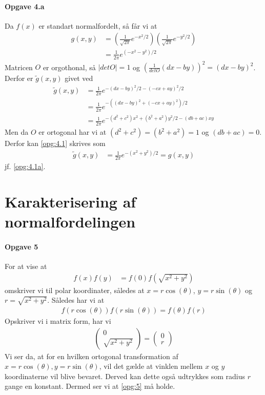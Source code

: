 \documentclass{article} %
\begin{document}
\paragraph*{Opgave 4.a}
Da \(f(x)\) er standart normalfordelt, så får vi at
\begin{align}
    g(x,y) & = \left(\frac{1}{\sqrt{2\pi}} e^{-x^2/2}\right)\left(\frac{1}{\sqrt{2\pi}} e^{-y^2/2}\right) \\
           & = \frac{1}{2\pi}e^{(-x^2-y^2)/2} \label{opg:4.1a}
\end{align}
Matricen \(O\) er orgothonal, så \(|detO|=1\) og \(\left(\frac{1}{detO}(dx-by)\right)^2=\left(dx-by\right)^2\). Derfor er \(\tilde{g}(x,y)\) givet ved
\begin{align}
   \tilde{g}(x,y) & =  \frac{1}{2\pi}e^{-(dx-by)^2/2-(-cx+ay)^2/2} \\
                  & =  \frac{1}{2\pi}e^{-\left((dx-by)^2+(-cx+ay)^2\right)/2} \\
                  & =  \frac{1}{2\pi}e^{-(d^2+c^2)x^2+(b^2+a^2)y^2/2-(db+ac)xy} \label{opg:4.1}
\end{align}
Men da \(O\) er ortogonal har vi at \((d^2+c^2)=(b^2+a^2)=1\) og \((db+ac)=0\). Derfor kan \cref{opg:4.1} skrives som
\begin{align}
   \tilde{g}(x,y) & =  \frac{1}{2\pi}e^{-(x^2+y^2)/2} = g(x,y)
\end{align}
jf. \cref{opg:4.1a}.
\section{Karakterisering af normalfordelingen} %
\label{sec:karaktisering_af_normalfordelingen}
\paragraph*{Opgave 5}
For at vise at
\begin{align}
    f(x)f(y) & = f(0)f(\sqrt{x^2+y^2}) \label{opg:5}
\end{align}
omskriver vi til polar koordinater, således at \(x=r\cos(\theta)\), \(y=r\sin(\theta)\) og \(r=\sqrt{x^2+y^2}\)\@. Således har vi at
\begin{align}
     f(r\cos(\theta))f(r\sin(\theta))=f(\theta)f(r)
 \end{align}
 Opskriver vi i matrix form, har vi
 \begin{align}
     \begin{pmatrix}
     0 \\ \sqrt{x^2+y^2}
     \end{pmatrix}
     =
     \begin{pmatrix}
     0 \\
     r
     \end{pmatrix}
 \end{align}
 Vi ser da, at for en hvilken ortogonal transformation af \(x=r\cos(\theta),y=r\sin(\theta)\), vil det gælde at vinklen mellem \(x\) og \(y\) koordinaterne vil blive bevaret. Derved kan dette også udtrykkes som radius \(r\) gange en konstant. Dermed ser vi at  \cref{opg:5} må holde.
\end{document}
